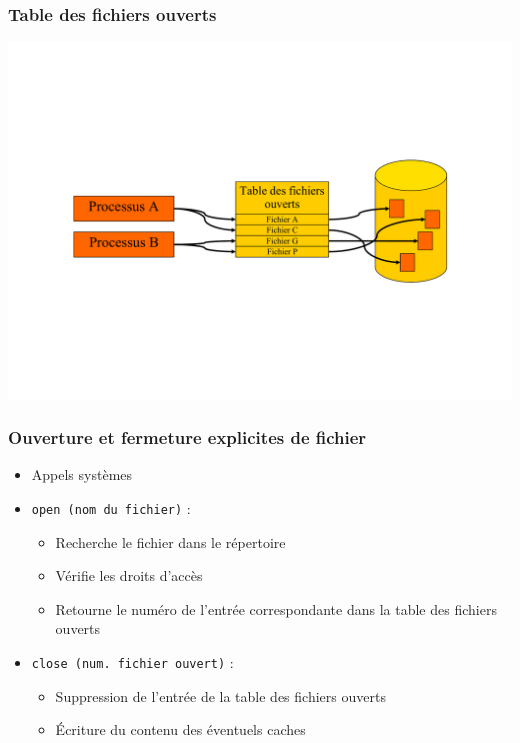 \begin{frame}
\frametitle{Table des fichiers ouverts}
\includegraphics[width=\textwidth]{../illustration/table_fichiers_ouverts.pdf}
\end{frame}

\begin{frame}
\frametitle{Ouverture et fermeture explicites de fichier}
\begin{itemize}
\item Appels systèmes
\item \texttt{open (nom du fichier)} :
\begin{itemize}
\item Recherche le fichier dans le répertoire
\item Vérifie les droits d'accès
\item Retourne le numéro de l'entrée correspondante dans la table des fichiers ouverts
\end{itemize}
\item \texttt{close (num. fichier ouvert)} :
\begin{itemize}
\item Suppression de l'entrée de la table des fichiers ouverts
\item Écriture du contenu des éventuels caches
\end{itemize}
\end{itemize}
\end{frame}

